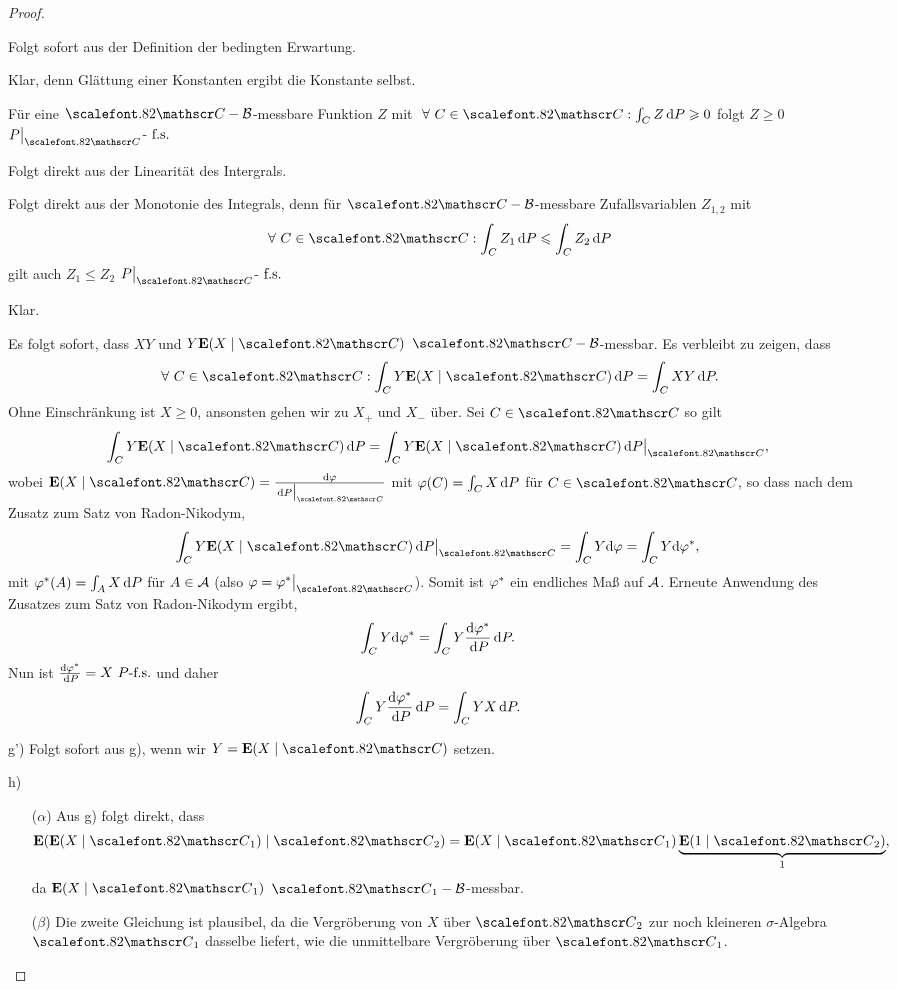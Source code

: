 \begin{proof}
\begin{proofenum}
\item Folgt sofort aus der Definition der bedingten Erwartung.
\item Klar, denn Glättung einer Konstanten ergibt die Konstante selbst.
\item Für eine $\CC-\BB$-messbare Funktion $Z$ mit $\forall C\in\CC : \int_C
Z\dP \ge 0$ folgt $Z\ge 0$ $P\big|_{\CC}$-$\fs$
\item Folgt direkt aus der Linearität des Intergrals.
\item Folgt direkt aus der Monotonie des Integrals, denn für $\CC-\BB$-messbare
Zufallsvariablen $Z_{1,2}$ mit
\begin{align*}
\forall C\in\CC : \int_C Z_1\dP \le \int_C Z_2\dP
\end{align*}
gilt auch $Z_1\le Z_2$ $P\big|_{\CC}$-$\fs$
\item Klar.
\item Es folgt sofort, dass $XY$ und $Y\E(X\mid \CC)$ $\CC-\BB$-messbar. Es
verbleibt zu zeigen, dass
\begin{align*}
\forall C\in \CC : \int_C Y \E (X\mid \CC)\dP = \int_C XY\dP.
\end{align*}
Ohne Einschränkung ist $X\ge 0$, ansonsten gehen wir zu $X_+$ und $X_-$ über.
Sei $C\in\CC$ so gilt
\begin{align*}
\int_C Y \E (X\mid \CC)\dP
=
\int_C Y \E (X\mid \CC)\dP\big|_{\CC},
\end{align*}
wobei $\E(X\mid \CC)=\frac{\dph}{\dP\big|_{\CC}}$ mit $\ph(C) = \int_C X\dP$ für
$C\in\CC$, so dass nach dem Zusatz zum Satz von Radon-Nikodym,
\begin{align*}
\int_C Y \E (X\mid \CC)\dP\big|_{\CC} = 
\int_C Y \dph = \int_C Y \dph^*, 
\end{align*}
mit $\ph^*(A) = \int_A X\dP$ für $A\in\AA$ (also $\ph=\ph^*\big|_{\CC}$). Somit
ist $\ph^*$ ein endliches Maß auf $\AA$. Erneute Anwendung des Zusatzes zum
Satz von Radon-Nikodym ergibt,
\begin{align*}
\int_C Y \dph^* = \int_C Y \frac{\dph^*}{\dP}\dP.
\end{align*}
Nun ist $\frac{\dph^*}{\dP} = X\Pfs$ und daher
\begin{align*}
\int_C Y \frac{\dph^*}{\dP}\dP=\int_C Y X\dP.
\end{align*}
\item[g')] Folgt sofort aus g), wenn wir $Y=\E(X\mid\CC)$ setzen.
\item[h)]
\begin{enumerate}[leftmargin=16pt]
\item[($\alpha$)] 
Aus g) folgt direkt, dass
\begin{align*}
\E(\E(X\mid\CC_1)\mid \CC_2) = \E(X\mid\CC_1)\underbrace{\E(1\mid\CC_2)}_{1},
\end{align*}
da $\E(X\mid\CC_1)$ $\CC_1-\BB$-messbar.
\item[($\beta$)]
Die zweite Gleichung ist plausibel, da die Vergröberung von $X$ über $\CC_2$
zur noch kleineren $\sigma$-Algebra $\CC_1$ dasselbe liefert, wie die unmittelbare
Vergröberung über $\CC_1$.


\end{enumerate}
\end{proofenum}
\end{proof}
